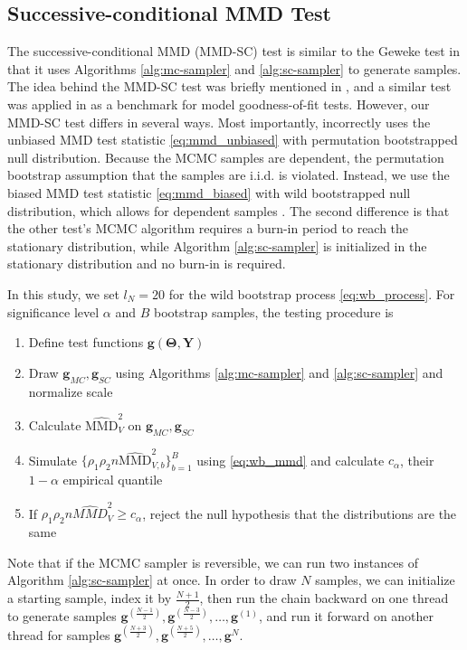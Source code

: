 \documentclass[a4paper,11pt]{article}
\begin{document}
\subsection{Successive-conditional MMD Test}
The successive-conditional MMD (MMD-SC) test is similar to the Geweke test in that it uses Algorithms \ref{alg:mc-sampler} and \ref{alg:sc-sampler} to generate samples. The idea behind the MMD-SC test was briefly mentioned in \cite{lloyd_statistical_2015}, and a similar test was applied in \cite{liu_kernelized_2016} as a benchmark for model goodness-of-fit tests. However, our MMD-SC test differs in several ways. Most importantly, \cite{liu_kernelized_2016} incorrectly uses the unbiased MMD test statistic \eqref{eq:mmd_unbiased} with permutation bootstrapped null distribution. Because the MCMC samples are dependent, the permutation bootstrap assumption that the samples are i.i.d. is violated. Instead, we use the biased MMD test statistic \eqref{eq:mmd_biased} with wild bootstrapped null distribution, which allows for dependent samples \cite{chwialkowski_wild_2016}. The second difference is that the other test's MCMC algorithm requires a burn-in period to reach the stationary distribution, while Algorithm \ref{alg:sc-sampler} is initialized in the stationary distribution and no burn-in is required.

In this study, we set $l_N=20$ for the wild bootstrap process \eqref{eq:wb_process}. For significance level $\alpha$ and $B$ bootstrap samples, the testing procedure is
\begin{enumerate}
    \item Define test functions $\mathbf{g}(\mathbf{\Theta}, \mathbf{Y})$
    \item Draw $\mathbf{g}_{MC}, \mathbf{g}_{SC}$ using Algorithms \ref{alg:mc-sampler} and \ref{alg:sc-sampler} and normalize scale
    \item Calculate $\widehat{\mathrm{MMD}}_{V}^{2}$ on $\mathbf{g}_{MC}, \mathbf{g}_{SC}$
    \item Simulate $\{\rho_{1} \rho_{2} n \widehat{\mathrm{MMD}}^{2}_{V, b}\}_{b=1}^{B}$ using \eqref{eq:wb_mmd} and calculate $c_{\alpha}$, their $1-\alpha$ empirical quantile
    \item If $\rho_{1} \rho_{2} n \widehat{MMD}^{2}_{V} \geq c_{\alpha}$, reject the null hypothesis that the distributions are the same
\end{enumerate}

Note that if the MCMC sampler is reversible, we can run two instances of Algorithm \ref{alg:sc-sampler} at once. In order to draw $N$ samples, we can initialize a starting sample, index it by $\frac{N+1}{2}$, then run the chain backward on one thread to generate samples $\mathbf{g}^{(\frac{N-1}{2})}, \mathbf{g}^{(\frac{N-3}{2})}, \ldots, \mathbf{g}^{(1)}$, and run it forward on another thread for samples $\mathbf{g}^{(\frac{N+3}{2})}, \mathbf{g}^{(\frac{N+5}{2})}, \ldots, \mathbf{g}^{N}$.
\end{document}
